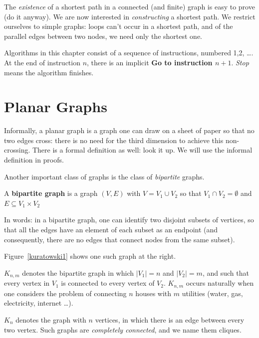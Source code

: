 The {\em existence} of a shortest path in a connected (and finite)
graph is easy to prove (do it anyway). We are now interested in {\em
constructing} a shortest path. We restrict ourselves to simple graphs:
loops can't occur in a shortest path, and of the parallel edges
between two nodes, we need only the shortest one.

Algorithms in this chapter consist of a sequence of instructions,
numbered 1,2, \ldots . At the end of instruction $n$, there is an
implicit {\bf Go to instruction $n+1$}. {\em Stop} means the algorithm
finishes.


\section{Planar Graphs}

Informally, a planar graph is a graph one can draw on a sheet of
paper so that no two edges cross: there is no need for the third
dimension to achieve this non-crossing. There is a formal definition
as well: look it up. We will use the informal definition in proofs.

Another important class of graphs is the class of {\em bipartite}
graphs.

 \begin{definition}
  \textup{A \textbf{bipartite graph} is a graph $(V,E)$ with $V =
V_{1} \cup V_{2}$ so that $V_{1} \cap V_{2} = \emptyset$ and $E
\subseteq V_{1} \times V_{2}$ }
\end{definition}

In words: in a bipartite graph, one can identify two disjoint subsets
of vertices, so that all the edges have an element of each subset as
an endpoint (and consequently, there are no edges that connect nodes
from the same subset).

Figure~\ref{kuratowski1} shows one such graph at the right.

$K_{n,m}$ denotes the bipartite graph in which $|V_{1}| = n$ and
$|V_{2}| = m$, and such that every vertex in $V_{1}$ is connected to
every vertex of $V_{2}$. $K_{n,m}$ occurs naturally when one considers
the problem of connecting $n$ houses with $m$ utilities (water, gas,
electricity, internet \ldots).

$K_{n}$ denotes the graph with $n$ vertices, in which there is an edge
between every two vertex. Such graphs are {\em completely
connected}, and we name them cliques.

